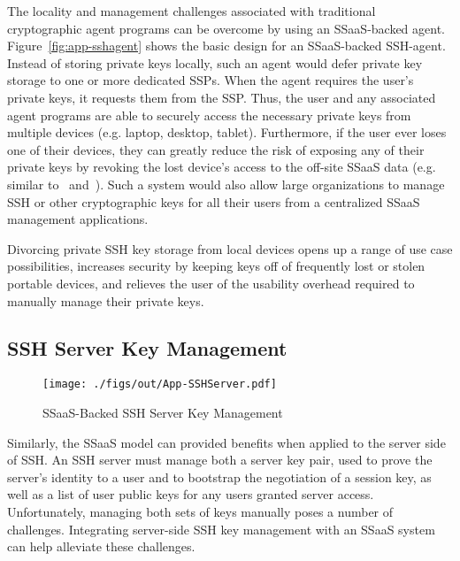 The locality and management challenges associated with traditional
cryptographic agent programs can be overcome by using an SSaaS-backed
agent. Figure~\ref{fig:app-sshagent} shows the basic design for an
SSaaS-backed SSH-agent. Instead of storing private keys locally, such
an agent would defer private key storage to one or more dedicated
SSPs. When the agent requires the user's private keys, it requests
them from the SSP. Thus, the user and any associated agent programs
are able to securely access the necessary private keys from multiple
devices (e.g. laptop, desktop, tablet). Furthermore, if the user ever
loses one of their devices, they can greatly reduce the risk of
exposing any of their private keys by revoking the lost device's
access to the off-site SSaaS data (e.g. similar to~\cite{geambasu2011}
and~\cite{tang2012}). Such a system would also allow large
organizations to manage SSH or other cryptographic keys for all their
users from a centralized SSaaS management applications.

Divorcing private SSH key storage from local devices opens up a range
of use case possibilities, increases security by keeping keys off of
frequently lost or stolen portable devices, and relieves the user of
the usability overhead required to manually manage their private keys.

\subsection{SSH Server Key Management}

\begin{figure}[t]
  \centering
  \texttt{[image: ./figs/out/App-SSHServer.pdf]}
  \caption{SSaaS-Backed SSH Server Key Management}
  \label{fig:apps-sshserver}
\end{figure}

Similarly, the SSaaS model can provided benefits when applied to the
server side of SSH. An SSH server must manage both a server key pair,
used to prove the server's identity to a user and to bootstrap the
negotiation of a session key, as well as a list of user public keys
for any users granted server access. Unfortunately, managing both sets
of keys manually poses a number of challenges. Integrating server-side
SSH key management with an SSaaS system can help alleviate these
challenges.

